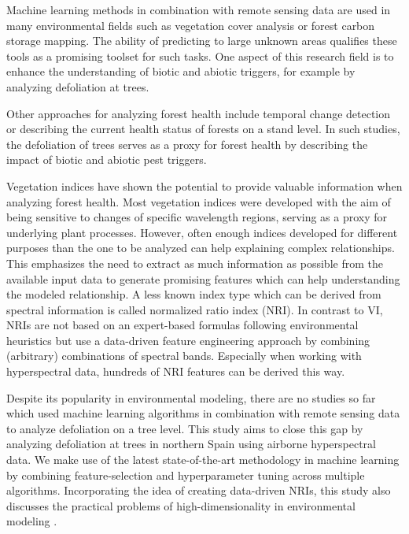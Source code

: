 \documentclass[letterpaper, peerreview]{IEEEtran}
\begin{document}

Machine learning methods in combination with remote sensing data are used in many environmental fields such as vegetation cover analysis or forest carbon storage mapping\cite{mascaro2014, urban2018}.
The ability of predicting to large unknown areas qualifies these tools as a promising toolset for such tasks.
One aspect of this research field is to enhance the understanding of biotic and abiotic triggers, for example by analyzing defoliation at trees\cite{hawrylo2018}.

Other approaches for analyzing forest health include temporal change detection\cite{zhang2016} or describing the current health status of forests on a stand level\cite{townsend2012}.
In such studies, the defoliation of trees serves as a proxy for forest health by describing the impact of biotic and abiotic pest triggers\cite{townsend2012, goodbody2018}.

Vegetation indices have shown the potential to provide valuable information when analyzing forest health\cite{jiang2014, adamczyk2015}.
Most vegetation indices were developed with the aim of being sensitive to changes of specific wavelength regions, serving as a proxy for underlying plant processes. 
However, often enough indices developed for different purposes than the one to be analyzed can help explaining complex relationships.
This emphasizes the need to extract as much information as possible from the available input data to generate promising features which can help understanding the modeled relationship.
A less known index type which can be derived from spectral information is called normalized ratio index (NRI).
In contrast to \ac{VI}, \ac{NRI}s are not based on an expert-based formulas following environmental heuristics but use a data-driven feature engineering approach by combining (arbitrary) combinations of spectral bands.
Especially when working with hyperspectral data, hundreds of \ac{NRI} features can be derived this way.


Despite its popularity in environmental modeling, there are no studies so far which used machine learning algorithms in combination with remote sensing data to analyze defoliation on a tree level.
This study aims to close this gap by analyzing defoliation at trees in northern Spain using airborne hyperspectral data.
We make use of the latest state-of-the-art methodology in machine learning by combining feature-selection and hyperparameter tuning across multiple algorithms.
Incorporating the idea of creating data-driven \ac{NRI}s, this study also discusses the practical problems of high-dimensionality in environmental modeling \cite{trunk1979, xu2016}.
\end{document}
